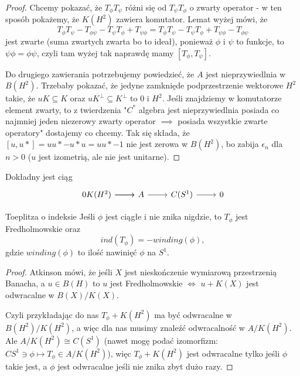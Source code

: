 \documentclass[12pt]{book}
\begin{document}
\begin{proof}
  Chcemy pokazać, że $T_\phi T_\psi$ różni się od $T_\psi T_\phi$ o zwarty operator - w ten sposób pokażemy, że $K(H^2)$ zawiera komutator. Lemat wyżej mówi, że
  $$T_\phi T_\psi -T_{\phi\psi}-T_\psi T_\phi+T_{\psi\phi}=T_\phi T_\psi - T_\psi T_\phi +T_{\psi\phi}-T_{\phi\psi}$$
  jest zwarte (suma zwartych zwarta bo to ideał), ponieważ $\phi$ i $\psi$ to funkcje, to $\psi\phi=\phi\psi$, czyli tam wyżej tak naprawdę mamy $[T_\phi, T_\psi]$.

  Do drugiego zawierania potrzebujemy powiedzieć, że $A$ jest nieprzywiedlnia w $B(H^2)$. Trzebaby pokazać, że jedyne zamknięde podprzestrzenie wektorowe $H^2$ takie, że $uK\subseteq K$ oraz $uK^\perp\subseteq K^\perp$ to $0$ i $H^2$. Jeśli znajdziemy w komutatorze element zwarty, to z twierdzenia "$C^*$ algebra jest nieprzywiedlnia posiada co najmniej jeden niezerowy zwarty operator $\implies$ posiada wszystkie zwarte operatory" dostajemy co chcemy. Tak się składa, że $[u,u*]=uu*-u*u=uu*-1$ nie jest zerowa w $B(H^2)$, bo zabija $\epsilon_n$ dla $n>0$ ($u$ jest izometrią, ale nie jest unitarne).
\end{proof}

\begin{theorem}{}{}
  Dokładny jest ciąg
  $$\begin{tikzcd} 0\arrow[r] K(H^2)\arrow[r] & A \arrow[r] & C(S^1) \arrow[r] & 0 \end{tikzcd}$$
\end{theorem}

\begin{theorem}{Toeplitza o indeksie}{}
  Jeśli $\phi$ jest ciągłe i nie znika nigdzie, to $T_\phi$ jest Fredholmowskie oraz 
  $$ind(T_\phi)=-winding(\phi),$$
  gdzie $winding(\phi)$ to ilość nawinięć $\phi$ na $S^1$.
\end{theorem}

\begin{proof}
  Atkinson mówi, że jeśli $X$ jest nieskończenie wymiarową przestrzenią Banacha, a $u\in B(H)$ to $u$ jest Fredholmowskie $\iff$ $u+K(X)$ jest odwracalne w $B(X)/K(X)$.

  Czyli przykładając do nas $T_\phi+K(H^2)$ ma być odwracalne w $B(H^2)/K(H^2)$, a więc dla nas musimy znaleźć odwracalność w $A/K(H^2)$. Ale $A/K(H^2)\cong C(S^1)$ (nawet mogę podać izomorfizm: $CS^1\ni \phi\mapsto T_\phi\in A/K(H^2)$), więc $T_\phi+K(H^2)$ jest odwracalne tylko jeśli $\phi$ takie jest, a $\phi$ jest odwracalne jeśli nie znika zbyt dużo razy.
\end{proof}
\end{document}
